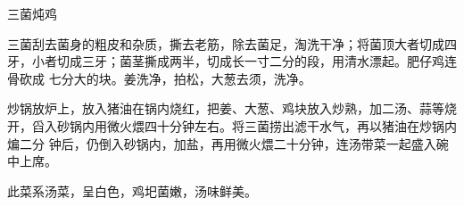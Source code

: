 \begin{recipe}{三菌炖鸡\protect\footnotemark}

\ingredients


\cooking

\step 三菌刮去菌身的粗皮和杂质，撕去老筋，除去菌足，淘洗干净；将菌顶大者切成四
牙，小者切成三牙；菌茎撕成两半，切成长一寸二分的段，用清水漂起。肥仔鸡连骨砍成
七分大的块。姜洗净，拍松，大葱去须，洗净。

\step 炒锅放炉上，放入猪油在锅内烧红，把姜、大葱、鸡块放入炒熟，加二汤、蒜等烧
开，舀入砂锅内用微火煨四十分钟左右。将三菌捞出滤干水气，再以猪油在炒锅内煸二分
钟后，仍倒入砂锅内，加盐，再用微火煨二十分钟，连汤带菜一起盛入碗中上席。

\features

此菜系汤菜，呈白色，鸡圯菌嫩，汤味鲜美。


\end{recipe}


